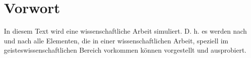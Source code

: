 \chapter*{Vorwort}
In diesem Text wird eine wissenschaftliche Arbeit simuliert. D. h. es werden nach und nach alle Elementen, die in einer wissenschaftlichen Arbeit, speziell im geisteswissenschaftlichen Bereich vorkommen können vorgestellt und ausprobiert. 